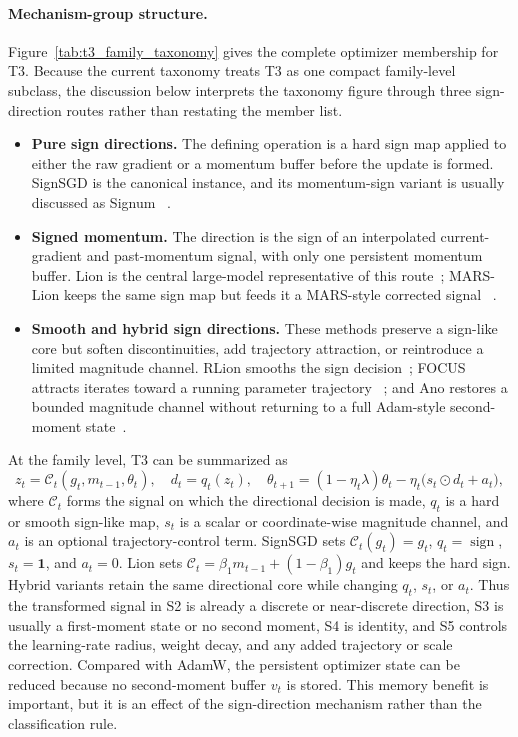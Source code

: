 \paragraph{Mechanism-group structure.}
Figure~\ref{tab:t3_family_taxonomy} gives the complete optimizer membership for
T3.  Because the current taxonomy treats T3 as one compact family-level
subclass, the discussion below interprets the taxonomy figure through three
sign-direction routes rather than restating the member list.
\begin{itemize}[leftmargin=*,itemsep=2pt]
  \item \textbf{Pure sign directions.}
  The defining operation is a hard sign map applied to either the raw gradient
  or a momentum buffer before the update is formed.  SignSGD is the canonical
  instance, and its momentum-sign variant is usually discussed as Signum
  ~\citep{bernstein2018signsgd}.
  \item \textbf{Signed momentum.}
  The direction is the sign of an interpolated current-gradient and
  past-momentum signal, with only one persistent momentum buffer.  Lion is the
  central large-model representative of this route~\citep{chen2023symbolic};
  MARS-Lion keeps the same sign map but feeds it a MARS-style corrected signal
  ~\citep{yuan2024mars}.
  \item \textbf{Smooth and hybrid sign directions.}
  These methods preserve a sign-like core but soften discontinuities, add
  trajectory attraction, or reintroduce a limited magnitude channel.  RLion
  smooths the sign decision~\citep{rong2024rlion};
  FOCUS attracts iterates toward a running parameter trajectory
  ~\citep{liu2025focus}; and Ano restores a bounded magnitude channel without
  returning to a full Adam-style second-moment state~\citep{kegreisz2025ano}.
\end{itemize}

At the family level, T3 can be summarized as
\begin{equation}
  z_t = \mathcal{C}_t(g_t,m_{t-1},\theta_t),\quad
  d_t = q_t(z_t),\quad
  \theta_{t+1}
  = (1-\eta_t\lambda)\theta_t
    - \eta_t\big(s_t\odot d_t+a_t\big),
  \label{eq:t3-direction-template}
\end{equation}
where $\mathcal{C}_t$ forms the signal on which the directional decision is
made, $q_t$ is a hard or smooth sign-like map, $s_t$ is a scalar or
coordinate-wise magnitude channel, and $a_t$ is an optional trajectory-control
term.  SignSGD sets $\mathcal{C}_t(g_t)=g_t$, $q_t=\operatorname{sign}$,
$s_t=\mathbf{1}$, and $a_t=0$.  Lion sets
$\mathcal{C}_t=\beta_1m_{t-1}+(1-\beta_1)g_t$ and keeps the hard sign.  Hybrid
variants retain the same directional core while changing $q_t$, $s_t$, or
$a_t$.  Thus the transformed signal in S2 is already a discrete or
near-discrete direction, S3 is usually a first-moment state or no second
moment, S4 is identity, and S5 controls the learning-rate radius, weight
decay, and any added trajectory or scale correction.  Compared with AdamW,
the persistent optimizer state can be reduced because no second-moment buffer
$v_t$ is stored.  This memory benefit is important, but it is an effect of the
sign-direction mechanism rather than the classification rule.

